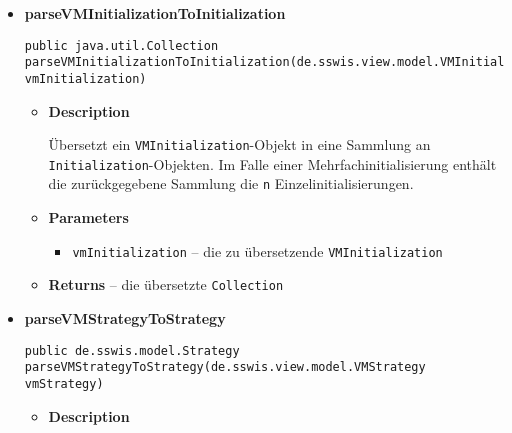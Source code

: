 {{{{{{{\begin{itemize}
{\begin{itemize}
{Übersetzt ein \texttt{\small VMGroup}-Objekt in ein \texttt{\small Group}-Objekt.
}
\item{
{\bf  Parameters}
  \begin{itemize}
   \item{
\texttt{vmGroup} -- die zu übersetzende \texttt{\small VMGroup}}
  \end{itemize}
}%
\item{{\bf  Returns} -- 
die übersetzte \texttt{\small Group} 
}%
\end{itemize}
}%
\item{ 
\hypertarget{de.sswis.controller.ModelParser.parseVMInitializationToInitialization(de.sswis.view.model.VMInitialization)}{{\bf  parseVMInitializationToInitialization}\\}
\begin{lstlisting}[frame=none]
public java.util.Collection parseVMInitializationToInitialization(de.sswis.view.model.VMInitialization vmInitialization)\end{lstlisting} %
\begin{itemize}
\item{
{\bf  Description}

Übersetzt ein \texttt{\small VMInitialization}-Objekt in eine Sammlung an \texttt{\small Initialization}-Objekten. Im Falle einer Mehrfachinitialisierung enthält die zurückgegebene Sammlung die \texttt{\small n} Einzelinitialisierungen.
}
\item{
{\bf  Parameters}
  \begin{itemize}
   \item{
\texttt{vmInitialization} -- die zu übersetzende \texttt{\small VMInitialization}}
  \end{itemize}
}%
\item{{\bf  Returns} -- 
die übersetzte \texttt{\small Collection} 
}%
\end{itemize}
}%
\item{ 
\hypertarget{de.sswis.controller.ModelParser.parseVMStrategyToStrategy(de.sswis.view.model.VMStrategy)}{{\bf  parseVMStrategyToStrategy}\\}
\begin{lstlisting}[frame=none]
public de.sswis.model.Strategy parseVMStrategyToStrategy(de.sswis.view.model.VMStrategy vmStrategy)\end{lstlisting} %
\begin{itemize}
\item{
{\bf  Description}

}
\end{itemize}}
\end{itemize}}}}}}}}

